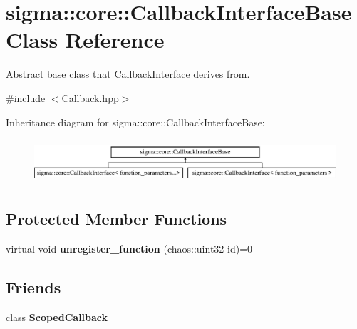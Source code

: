 \hypertarget{classsigma_1_1core_1_1_callback_interface_base}{\section{sigma\-:\-:core\-:\-:Callback\-Interface\-Base Class Reference}
\label{classsigma_1_1core_1_1_callback_interface_base}
}


Abstract base class that \hyperlink{classsigma_1_1core_1_1_callback_interface}{Callback\-Interface} derives from.  




{\ttfamily \#include $<$Callback.\-hpp$>$}

Inheritance diagram for sigma\-:\-:core\-:\-:Callback\-Interface\-Base\-:\begin{figure}[H]
\begin{center}
\leavevmode
\includegraphics[height=1.671642cm]{classsigma_1_1core_1_1_callback_interface_base}
\end{center}
\end{figure}
\subsection*{Protected Member Functions}
\begin{DoxyCompactItemize}
\item 
\hypertarget{classsigma_1_1core_1_1_callback_interface_base_ae9363aec7da50f8508100e8b62b89adf}{virtual void {\bfseries unregister\-\_\-function} (chaos\-::uint32 id)=0}\label{classsigma_1_1core_1_1_callback_interface_base_ae9363aec7da50f8508100e8b62b89adf}

\end{DoxyCompactItemize}
\subsection*{Friends}
\begin{DoxyCompactItemize}
\item 
\hypertarget{classsigma_1_1core_1_1_callback_interface_base_a3414685dbc2eaa79d5e5af6729f74c0f}{class {\bfseries Scoped\-Callback}}\label{classsigma_1_1core_1_1_callback_interface_base_a3414685dbc2eaa79d5e5af6729f74c0f}

\end{DoxyCompactItemize}


